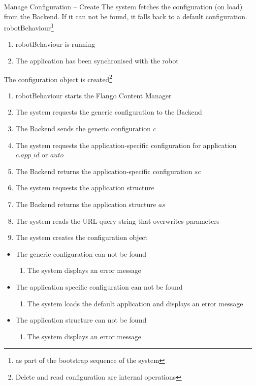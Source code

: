 \begin{suc}
{Manage Configuration -- Create}
{The system fetches the configuration (on load) from the Backend. If it can not be found, it falls back to a default configuration.}
{robotBehaviour\footnote{as part of the bootstrap sequence of the system}}
{
	\begin{enumerate}
        \item robotBehaviour is running
        \item The application has been synchronised with the robot
    \end{enumerate}}
{
The configuration object is created\footnote{Delete and read configuration are internal operations}
}
{
    \begin{enumerate}
        \item robotBehaviour starts the Flango Content Manager
        \item The system requests the generic configuration to the Backend
		\item The Backend sends the generic configuration $c$
		\item The system requests the application-specific configuration for application $c.app\_id$ or $auto$
		\item The Backend returns the application-specific configuration $sc$
		\item The system requests the application structure
		\item The Backend returns the application structure $as$
		\item The system reads the URL query string that overwrites parameters
		\item The system creates the configuration object
    \end{enumerate}
}
{    
	\begin{itemize}
        \item The generic configuration can not be found
        \begin{enumerate}
        	\item The system displays an error message
    	\end{enumerate}
    	\item The application specific configuration can not be found
        \begin{enumerate}
        	\item The system loads the default application and displays an error message
    	\end{enumerate}
    	\item The application structure can not be found
        \begin{enumerate}
        	\item The system displays an error message
    	\end{enumerate}
    \end{itemize}   
}
\end{suc}


